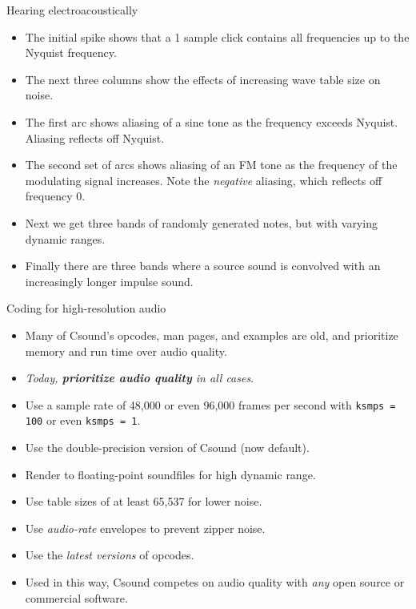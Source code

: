 \documentclass{beamer}
\begin{document}
\begin{frame}{Hearing electroacoustically}
\begin{itemize}
\item The initial spike shows that a 1 sample click contains all frequencies up to the Nyquist frequency.
\item The next three columns show the effects of increasing wave table size on noise.
\item The first arc shows aliasing of a sine tone as the frequency exceeds Nyquist. Aliasing reflects off Nyquist.
\item The second set of arcs shows aliasing of an FM tone as the frequency of the modulating signal increases. Note the \emph{negative} aliasing, which reflects off frequency 0.
\item Next we get three bands of randomly generated notes, but with varying dynamic ranges.
\item Finally there are three bands where a source sound is convolved with an increasingly longer impulse sound.
\end{itemize}
\end{frame}

\begin{frame}{Coding for high-resolution audio}
\begin{itemize}
\item Many of Csound's opcodes, man pages, and examples are old, and
prioritize memory and run time over audio quality.
\item \textit{Today, \textbf{prioritize audio quality} in all cases}.
\item Use a sample rate of 48,000 or even 96,000 frames per second with
\texttt{ksmps = 100} or even \texttt{ksmps = 1}.
\item Use the double-precision version of Csound (now default).
\item Render to floating-point soundfiles for high dynamic range.
\item Use table sizes of at least 65,537 for lower noise.
\item Use \textit{audio-rate} envelopes to prevent zipper noise.
\item Use the \textit{latest versions} of opcodes.
\item Used in this way, Csound competes on audio quality with
\textit{any} open source or commercial software.
\end{itemize}
\end{frame}
\end{document}
